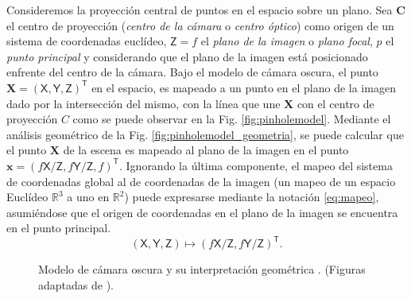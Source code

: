 Consideremos la proyección central de puntos en el espacio sobre un plano. Sea $\mathbf{C}$ el centro de proyección (\textit{centro de la cámara} o \textit{centro óptico}) como origen de un sistema de coordenadas euclídeo, $\mathsf{Z}=f$ el \textit{plano de la imagen} o \textit{plano focal}, $p$ el \textit{punto principal} y considerando que el plano de la imagen está posicionado enfrente del centro de la cámara. Bajo el modelo de cámara oscura, el punto $\mathbf{X}=(\mathsf{X},\mathsf{Y},\mathsf{Z})^\mathsf{T}$ en el espacio, es mapeado a un punto en el plano de la imagen dado por la intersección del mismo, con la línea que une $\mathbf{X}$ con el centro de proyección $C$ como se puede observar en la Fig. \ref{fig:pinholemodel}. Mediante el análisis geométrico de la Fig. \ref{fig:pinholemodel_geometria}, se puede calcular que el punto $\mathbf{X}$ de la escena es mapeado al plano de la imagen en el punto $\mathbf{x}=(\mathit{f}\mathsf{X}/\mathsf{Z}, \mathit{f}\mathsf{Y}/\mathsf{Z}, f)^\mathsf{T}$. Ignorando la última componente, el mapeo del sistema de coordenadas global al de coordenadas de la imagen (un mapeo de un espacio Euclídeo $\mathbb{R}^3$ a uno en $\mathbb{R}^2$) puede expresarse mediante la notación \eqref{eq:mapeo}, asumiéndose que el origen de coordenadas en el plano de la imagen se encuentra en el punto principal.
\begin{equation}
  \label{eq:mapeo}
  (\mathsf{X},\mathsf{Y},\mathsf{Z}) \mapsto (\mathit{f}\mathsf{X}/\mathsf{Z}, \mathit{f}\mathsf{Y}/\mathsf{Z})^\mathsf{T}.
\end{equation}
\begin{figure}[tbhp]
	\centering
	\hspace{0.1\linewidth}
	\label{fig:pinholecmaeramodelinterpretation}                %
	\caption[Modelo de cámara oscura y su interpretación geométrica]{Modelo de cámara oscura  y su interpretación geométrica . (Figuras adaptadas de \cite{Hartley2004}).}
\end{figure}

